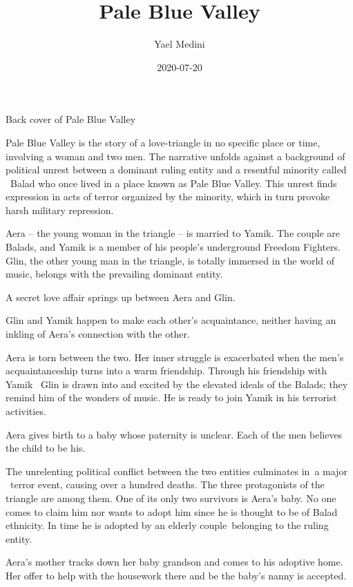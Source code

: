 \documentclass[12pt]{book}
\title{Pale Blue Valley}
\author{Yael Medini}
\date{2020-07-20}
\begin{document}
\maketitle


{Back cover of Pale Blue Valley}


\bigskip

{Pale Blue Valley is the story of a love-triangle in no specific place
or time, involving a woman and two men. The narrative unfolds against a background of political unrest between a
dominant ruling entity and a resentful minority called \ Balad who once lived in a place known as Pale Blue Valley.
This unrest finds expression in acts of terror organized by the minority, which in turn provoke harsh military
repression.}

{Aera -- the young woman in the triangle -- is married to Yamik. The
couple are Balads, and Yamik is a member of his people's underground Freedom Fighters. Glin, the other young man in the
triangle, is totally immersed in the world of music, belongs with the prevailing dominant entity. \ }

{A secret love affair springs up between Aera and Glin. \ }

{Glin and Yamik happen to make each other's acquaintance, neither
having an inkling of Aera's connection with the other.}

{Aera is torn between the two. Her inner struggle is exacerbated when
the men's acquaintanceship turns into a warm friendship. Through his friendship with Yamik \ Glin is drawn into and
excited by the elevated ideals of the Balads; they remind him of the wonders of music. He is ready to join Yamik in his
terrorist activities.}

{Aera gives birth to a baby whose paternity is unclear. Each of the men
believes the child to be his.}

{The unrelenting political conflict between the two entities culminates
in~a major \ terror event, causing over a hundred deaths. The three protagonists of the
{\textquotedbl}triangle{\textquotedbl} are among them. One of its only two survivors is Aera's baby. No one comes to
claim him nor wants to adopt him since he is thought to be of Balad ethnicity. In time he is adopted by an elderly
couple~belonging to the ruling entity. }

{Aera's mother tracks down her baby grandson and comes to his adoptive
home. Her offer to help with the housework there and be the baby's nanny is accepted. }


\bigskip
\end{document}
